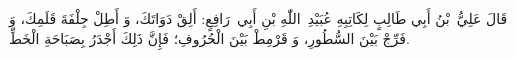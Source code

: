 قَالَ عَلِيُّ بْنُ أَبِي طَالِبٍ لِكَاتِبِهِ عُبَيْدِ اللّٰهِ بْنِ
أَبِي رَافِعٍ: أَلِقْ دَوَاتَكَ، وَ أَطِلْ جِلْفَةَ قَلَمِكَ، وَ فَرِّجْ
بَيْنَ السُّطُورِ، وَ قَرْمِطْ بَيْنَ الْحُرُوفِ؛ فَإِنَّ ذَلِكَ أَجْدَرُ
بِصَبَاحَةِ الْخَطِّ.
